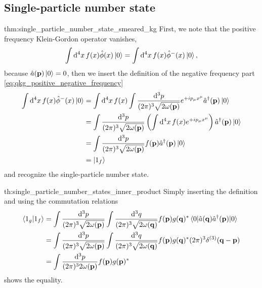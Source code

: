 \subsection{Single-particle number state}

\begin{delayedproof}{thm:single_particle_number_state_smeared_kg}
	First, we note that the positive frequency Klein-Gordon operator vanishes,
	\begin{equation*}
		\int\dd[4]{x}
		f(x)
		\hat\phi(x)
		\ket{0}
		=
		\int\dd[4]{x}
		f(x)
		\hat\phi^-(x)
		\ket{0}
		,
	\end{equation*}
	because $\hat{a}(\vb{p})\ket{0}=0$, then we insert the definition of the negative frequency part \cref{eq:qkg_positive_negative_frequency}
	\begin{equation*}
		\begin{split}
			\int\dd[4]{x}
			f(x)
			\hat\phi^-(x)
			\ket{0}
			&=
			\int\dd[4]{x}
			f(x)
			\int\frac{\dd[3]{p}}{(2\pi)^3\sqrt{2\omega(\vb{p})}}
			e^{+ip_\mu x^\mu}
			\hat{a}^\dagger(\vb{p})
			\ket{0}
			\\
			&=
			\int\frac{\dd[3]{p}}{(2\pi)^3\sqrt{2\omega(\vb{p})}}
			\left(
				\int\dd[4]{x}
				f(x)
				e^{+ip_\mu x^\mu}
			\right)
			\hat{a}^\dagger(\vb{p})
			\ket{0}
			\\
			&=
			\int\frac{\dd[3]{p}}{(2\pi)^3\sqrt{2\omega(\vb{p})}}
			f(\vb{p})
			\hat{a}^\dagger(\vb{p})
			\ket{0}
			\\
			&=
			\ket{1_f}
		\end{split}
	\end{equation*}
	and recognize the single-particle number state.
\end{delayedproof}
\begin{delayedproof}{th:single_particle_number_states_inner_product}
	Simply inserting the definition and using the commutation relations
	\begin{equation*}
		\begin{split}
			\bra{1_g}\ket{1_f}
			&=
			\int\frac{\dd[3]{p}}{(2\pi)^3\sqrt{2\omega(\vb{p})}}
			\int\frac{\dd[3]{q}}{(2\pi)^3\sqrt{2\omega(\vb{q})}}
			f(\vb{p})g(\vb{q})^*
			\expval{\hat{a}(\vb{q})\hat{a}^\dagger(\vb{p})}{0}
			\\
			&=
			\int\frac{\dd[3]{p}}{(2\pi)^3\sqrt{2\omega(\vb{p})}}
			\int\frac{\dd[3]{q}}{(2\pi)^3\sqrt{2\omega(\vb{q})}}
			f(\vb{p})g(\vb{q})^*
			(2\pi)^3\delta^{(3)}(\vb{q}-\vb{p})
			\\
			&=
			\int\frac{\dd[3]{p}}{(2\pi)^32\omega(\vb{p})}
			f(\vb{p})g(\vb{p})^*
		\end{split}
	\end{equation*}
	shows the equality.
\end{delayedproof}
